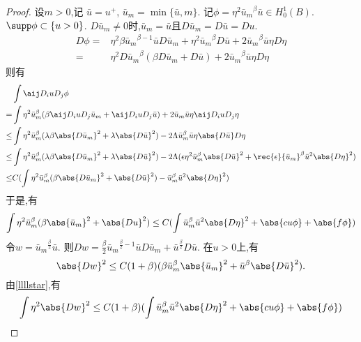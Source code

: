 \begin{proof}
\newcommand{\um}{{\bar{u}_m}}
\newcommand{\ub}{{\bar{u}}}
    设$m >0$,记 $\ub=u^+$, $\um=\min\{\ub,m\}$. 记$\phi=\eta^2 \um^\beta \ub \in H^1_0(B)$. $\supp \phi \subset \{u >0\}$. $D\um\ne 0$时,$\um=\ub$且$D\um = D\ub = Du$.
    \begin{equation}
        \begin{split}
            D\phi= &\eta^2 \beta \um^{\beta-1}\ub D\um+\eta^2\um^\beta D\ub + 2\um^\beta \ub \eta D\eta\\
            =& \eta^2 D\um^\beta(\beta D\um+D\ub)+2\um^\beta\ub \eta D\eta
        \end{split}
    \end{equation}
    则有
    \begin{equation}
        \begin{split}
            &\int \aij D_iuD_j\phi  \\
            =& \int \eta^2 \um^\beta (\beta\aij D_iuD_j\um+\aij D_iuD_j\ub)+2\um\ub\eta\aij D_iuD_j\eta \\
            \le & \int \eta^2 \um^\beta(\lambda\beta\abs{D\um}^2+\lambda\abs{D{\ub}}^2)-2\Lambda\um^\beta\ub\eta\abs{D\ub}D\eta\\
            \le & \int \eta^2 \um^\beta(\lambda\beta\abs{D\um}^2+\lambda\abs{D{\ub}}^2)-2\Lambda(\epsilon\eta^2\um^\beta \abs{D\ub}^2+\rec{\epsilon}\um^\beta\ub^2\abs{D\eta}^2)\\
            \le & C(\int \eta^2\um^\beta(\beta\abs{D\um}^2+\abs{D\ub}^2)-\um^\beta\ub^2\abs{D\eta}^2)
        \end{split}
    \end{equation}
    于是,有
    \begin{equation} \label{llllstar}
        \begin{split}
            \int \eta^2 \um^\beta(\beta\abs{\um}^2+\abs{Du}^2) \le  C(\int\um^\beta\ub^2\abs{D\eta}^2+\abs{cu\phi}+\abs{f\phi}) 
        \end{split}
    \end{equation}
    令$w=\um^{\frac{\beta}{2}}\ub$. 则$Dw=\frac{\beta}{2}\um^{\frac{\beta}{2}-1}\ub D\um+\ub^{\frac{\beta}{2}}D\ub$.
    在$u >0$上,有
    \begin{equation}
        \abs{Dw}^2 \le C(1+\beta)(\beta\um^\beta\abs{\um}^2+\ub^\beta\abs{D\ub}^2).
    \end{equation}
    由\eqref{llllstar},有
    \begin{equation}
        \int \eta^2\abs{Dw}^2 \le C(1+\beta)(\int \um^\beta\ub^2\abs{D\eta}^2+\abs{cu\phi}+\abs{f\phi})

\end{equation}
\end{proof}
